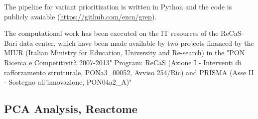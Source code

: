 The \gp pipeline for variant prioritization is written in Python and the code is publicly avaiable (\url{https://github.com/ezcn/grep}). 
 
The computational work has been executed on the IT resources of the ReCaS-Bari data center, which have been made available by two projects financed by the MIUR (Italian Ministry for Education, University and Re-search) in the "PON Ricerca e Competitività 2007-2013" Program: ReCaS (Azione I - Interventi di rafforzamento strutturale, PONa3\_00052, Avviso 254/Ric) and PRISMA (Asse II - Sostegno all'innovazione, PON04a2\_A)"




\subsection*{PCA Analysis, Reactome} 



